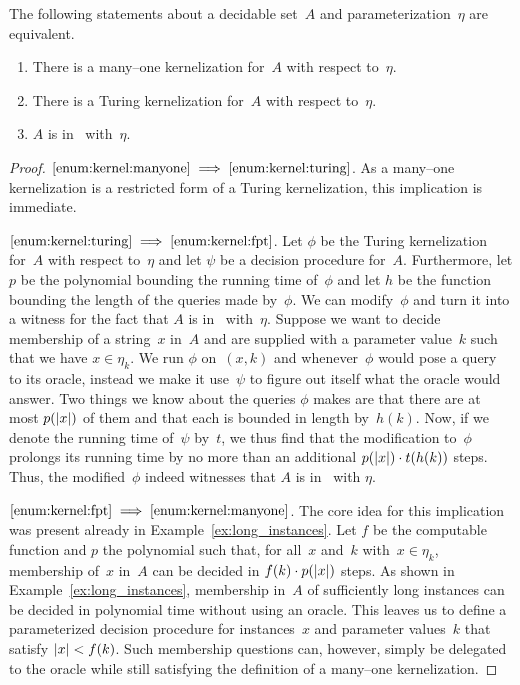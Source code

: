 \begin{theorem}
\label{thm:kernel_fpt}%
  The following statements about a decidable set~$A$ and parameterization~$\eta$ are equivalent.
  \begin{enumerate}
  \item\label{enum:kernel:manyone}
    There is a many--one kernelization for~$A$ with respect to~$\eta$.
  \item\label{enum:kernel:turing}
    There is a Turing kernelization for~$A$ with respect to~$\eta$.
  \item\label{enum:kernel:fpt}
    $A$ is in~ with~$\eta$.
  \end{enumerate}
\end{theorem}
\begin{proof}
$\ref{enum:kernel:manyone} \implies \ref{enum:kernel:turing}$.
  As a many--one kernelization is a restricted form of a Turing kernelization, this implication is immediate.

$\ref{enum:kernel:turing} \implies \ref{enum:kernel:fpt}$.
  Let $\phi$ be the Turing kernelization for~$A$ with respect to~$\eta$ and let $\psi$ be a decision procedure for~$A$.
  Furthermore, let $p$ be the polynomial bounding the running time of~$\phi$ and let $h$ be the function bounding the length of the queries made by~$\phi$.
  We can modify~$\phi$ and turn it into a witness for the fact that $A$ is in~ with~$\eta$.
  Suppose we want to decide membership of a string~$x$ in~$A$ and are supplied with a parameter value~$k$ such that we have $x \in \eta_k$.
  We run $\phi$ on~$(x, k)$ and whenever~$\phi$ would pose a query to its oracle, instead we make it use~$\psi$ to figure out itself what the oracle would answer.
  Two things we know about the queries $\phi$ makes are that there are at most $p({\lvert x\rvert})$ of them and that each is bounded in length by~$h(k)$.
  Now, if we denote the running time of~$\psi$ by~$t$, we thus find that the modification to~$\phi$ prolongs its running time by no more than an additional $p({\lvert x\rvert}) \cdot t(h(k))$ steps.
  Thus, the modified~$\phi$ indeed witnesses that $A$ is in~ with $\eta$.

$\ref{enum:kernel:fpt} \implies \ref{enum:kernel:manyone}$.
  The core idea for this implication was present already in Example~\ref{ex:long_instances}.
  Let $f$ be the computable function and $p$ the polynomial such that, for all~$x$ and~$k$ with~$x \in \eta_k$, membership of~$x$ in~$A$ can be decided in $f(k) \cdot p({\lvert x\rvert})$ steps.
  As shown in Example~\ref{ex:long_instances}, membership in~$A$ of sufficiently long instances can be decided in polynomial time without using an oracle.
  This leaves us to define a parameterized decision procedure for instances~$x$ and parameter values~$k$ that satisfy ${\lvert x\rvert} < f(k)$.
  Such membership questions can, however, simply be delegated to the oracle while still satisfying the definition of a many--one kernelization.
\end{proof}

